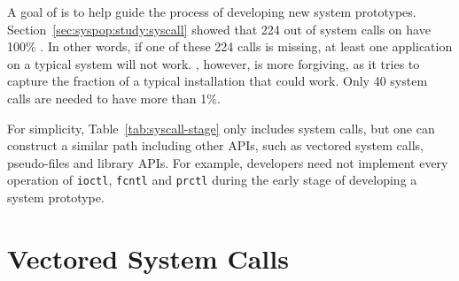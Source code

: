 A goal of \compatmetric{} is to help guide the process of developing new system prototypes.
Section~\ref{sec:syspop:study:syscall} showed that 224 out of \syscallnum{} system calls on \osdist{} have 100\% \usagemetric{}.
In other words, if one of these 224 calls is missing, at least one application on a typical system will not work.
\Compatmetric{}, however, is more forgiving, as
it tries to capture the fraction of a typical installation that could work.
Only 
40 system calls are needed to have \compatmetric{} more than 1\%.


For simplicity, Table~\ref{tab:syscall-stage}
only includes system calls, %
but one can construct a similar path including other APIs, %
such as vectored system calls, pseudo-files and library APIs.
For example, developers need not implement every operation of
{\tt ioctl}, {\tt fcntl} and {\tt prctl}
during the early stage of developing a system prototype.


\section{Vectored System Calls}
\label{sec:study:opcodes}


